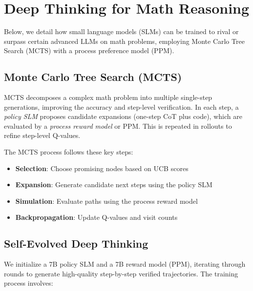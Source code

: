 \section{Deep Thinking for Math Reasoning}

Below, we detail how small language models (SLMs) can be trained to rival or surpass certain advanced LLMs on math problems, employing Monte Carlo Tree Search (MCTS) with a process preference model (PPM).

\subsection{Monte Carlo Tree Search (MCTS)}

MCTS decomposes a complex math problem into multiple single-step generations, improving the accuracy and step-level verification. In each step, a \emph{policy SLM} proposes candidate expansions (one-step CoT plus code), which are evaluated by a \emph{process reward model} or PPM. This is repeated in rollouts to refine step-level Q-values.

The MCTS process follows these key steps:
\begin{itemize}
    \item \textbf{Selection}: Choose promising nodes based on UCB scores
    \item \textbf{Expansion}: Generate candidate next steps using the policy SLM
    \item \textbf{Simulation}: Evaluate paths using the process reward model
    \item \textbf{Backpropagation}: Update Q-values and visit counts
\end{itemize}

\subsection{Self-Evolved Deep Thinking}

We initialize a 7B policy SLM and a 7B reward model (PPM), iterating through rounds to generate high-quality step-by-step verified trajectories. The training process involves:

